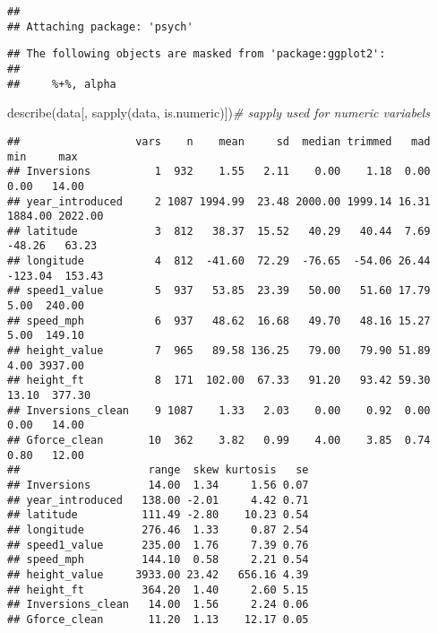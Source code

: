 \documentclass[
]{article}
\newenvironment{Shaded}{\begin{snugshade}}{\end{snugshade}}
\newcommand{\CommentTok}[1]{\textcolor[rgb]{0.56,0.35,0.01}{\textit{#1}}}
\newcommand{\FunctionTok}[1]{\textcolor[rgb]{0.00,0.00,0.00}{#1}}
\newcommand{\NormalTok}[1]{#1}
\begin{document}
\begin{verbatim}
## 
## Attaching package: 'psych'
\end{verbatim}

\begin{verbatim}
## The following objects are masked from 'package:ggplot2':
## 
##     %+%, alpha
\end{verbatim}

\begin{Shaded}
\begin{Highlighting}[]
\FunctionTok{describe}\NormalTok{(data[, }\FunctionTok{sapply}\NormalTok{(data, is.numeric)])}\CommentTok{\# sapply used for numeric variabels }
\end{Highlighting}
\end{Shaded}

\begin{verbatim}
##                  vars    n    mean     sd  median trimmed   mad     min     max
## Inversions          1  932    1.55   2.11    0.00    1.18  0.00    0.00   14.00
## year_introduced     2 1087 1994.99  23.48 2000.00 1999.14 16.31 1884.00 2022.00
## latitude            3  812   38.37  15.52   40.29   40.44  7.69  -48.26   63.23
## longitude           4  812  -41.60  72.29  -76.65  -54.06 26.44 -123.04  153.43
## speed1_value        5  937   53.85  23.39   50.00   51.60 17.79    5.00  240.00
## speed_mph           6  937   48.62  16.68   49.70   48.16 15.27    5.00  149.10
## height_value        7  965   89.58 136.25   79.00   79.90 51.89    4.00 3937.00
## height_ft           8  171  102.00  67.33   91.20   93.42 59.30   13.10  377.30
## Inversions_clean    9 1087    1.33   2.03    0.00    0.92  0.00    0.00   14.00
## Gforce_clean       10  362    3.82   0.99    4.00    3.85  0.74    0.80   12.00
##                    range  skew kurtosis   se
## Inversions         14.00  1.34     1.56 0.07
## year_introduced   138.00 -2.01     4.42 0.71
## latitude          111.49 -2.80    10.23 0.54
## longitude         276.46  1.33     0.87 2.54
## speed1_value      235.00  1.76     7.39 0.76
## speed_mph         144.10  0.58     2.21 0.54
## height_value     3933.00 23.42   656.16 4.39
## height_ft         364.20  1.40     2.60 5.15
## Inversions_clean   14.00  1.56     2.24 0.06
## Gforce_clean       11.20  1.13    12.17 0.05
\end{verbatim}
\end{document}
